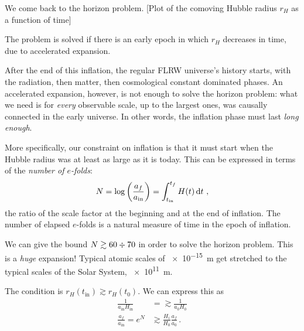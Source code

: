 \documentclass[main.tex]{subfiles}
\begin{document}

We come back to the horizon problem. 
[Plot of the comoving Hubble radius \(r_H\) as a function of time]

The problem is solved if there is an early epoch in which \(r_H\) decreases in time, due to accelerated expansion.

After the end of this inflation, the regular FLRW universe's history starts, with the radiation, then matter, then cosmological constant dominated phases. 
An accelerated expansion, however, is not enough to solve the horizon problem: what we need is for \emph{every} observable scale, up to the largest ones, was causally connected in the early universe.
In other words, the inflation phase must last \emph{long enough}.

More specifically, our constraint on inflation is that it must start when the Hubble radius was at least as large as it is today.
This can be expressed in terms of the \emph{number of \(e\)-folds}: 
%
\begin{align}
N = \log \qty( \frac{a_f}{a _{\text{in}}})
= \int_{t _{\text{in}}}^{t_f} H(t) \dd{t}
\,,
\end{align}
%
the ratio of the scale factor at the beginning and at the end of inflation.
The number of elapsed \(e\)-folds is a natural measure of time in the epoch of inflation. 

We can give the bound \(N \gtrsim 60 \divisionsymbol 70\) in order to solve the horizon problem. 
This is a \emph{huge} expansion! Typical atomic scales of \SI{e-15}{m} get stretched to the typical scales of the Solar System, \SI{e11}{m}. 

The condition is \(r_H (t _{\text{in}}) \gtrsim r_H (t_0 )\). 
We can express this as 
%
\begin{align}
\frac{1}{a _{\text{in}} H _{\text{in}}} &=\gtrsim \frac{1}{a_0 H_0 }  \\
\frac{a_f}{ a _{\text{in}}} = e^{N} &\gtrsim \frac{H_i}{H_0 } \frac{a_f}{a_0}
\,.
\end{align}
%
\end{document}
